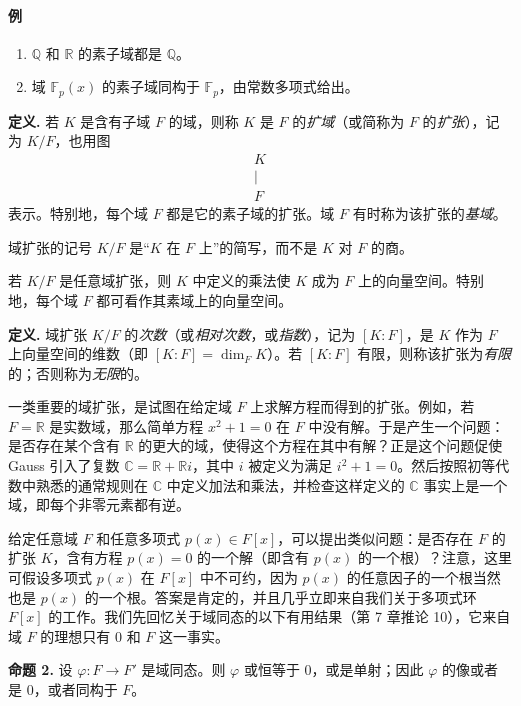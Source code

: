 \paragraph{例}
\begin{enumerate}[label=(\arabic*)]
	\item $\mathbb Q$ 和 $\mathbb R$ 的素子域都是 $\mathbb Q$。
	\item 域 $\mathbb F_p(x)$ 的素子域同构于 $\mathbb F_p$，由常数多项式给出。
\end{enumerate}

\noindent\textbf{定义.} 若 $K$ 是含有子域 $F$ 的域，则称 $K$ 是 $F$ 的\emph{扩域}（或简称为 $F$ 的\emph{扩张}），记为 $K/F$，也用图
\[
\begin{array}{c}
	K\\
	|\\
	F
\end{array}
\]
表示。特别地，每个域 $F$ 都是它的素子域的扩张。域 $F$ 有时称为该扩张的\emph{基域}。

域扩张的记号 $K/F$ 是“$K$ 在 $F$ 上”的简写，而不是 $K$ 对 $F$ 的商。

若 $K/F$ 是任意域扩张，则 $K$ 中定义的乘法使 $K$ 成为 $F$ 上的向量空间。特别地，每个域 $F$ 都可看作其素域上的向量空间。

\noindent\textbf{定义.} 域扩张 $K/F$ 的\emph{次数}（或\emph{相对次数}，或\emph{指数}），记为 $[K:F]$，是 $K$ 作为 $F$ 上向量空间的维数（即 $[K:F]=\dim_F K$）。若 $[K:F]$ 有限，则称该扩张为\emph{有限}的；否则称为\emph{无限}的。

一类重要的域扩张，是试图在给定域 $F$ 上求解方程而得到的扩张。例如，若 $F=\mathbb R$ 是实数域，那么简单方程 $x^2+1=0$ 在 $F$ 中没有解。于是产生一个问题：是否存在某个含有 $\mathbb R$ 的更大的域，使得这个方程在其中有解？正是这个问题促使 Gauss 引入了复数 $\mathbb C=\mathbb R+\mathbb R i$，其中 $i$ 被定义为满足 $i^2+1=0$。然后按照初等代数中熟悉的通常规则在 $\mathbb C$ 中定义加法和乘法，并检查这样定义的 $\mathbb C$ 事实上是一个域，即每个非零元素都有逆。

给定任意域 $F$ 和任意多项式 $p(x)\in F[x]$，可以提出类似问题：是否存在 $F$ 的扩张 $K$，含有方程 $p(x)=0$ 的一个解（即含有 $p(x)$ 的一个根）？注意，这里可假设多项式 $p(x)$ 在 $F[x]$ 中不可约，因为 $p(x)$ 的任意因子的一个根当然也是 $p(x)$ 的一个根。答案是肯定的，并且几乎立即来自我们关于多项式环 $F[x]$ 的工作。我们先回忆关于域同态的以下有用结果（第 7 章推论 10），它来自域 $F$ 的理想只有 $0$ 和 $F$ 这一事实。

\noindent\textbf{命题 2.} 设 $\varphi:F\longrightarrow F'$ 是域同态。则 $\varphi$ 或恒等于 $0$，或是单射；因此 $\varphi$ 的像或者是 $0$，或者同构于 $F$。


